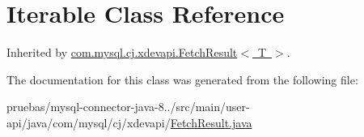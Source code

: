 \hypertarget{class_iterable}{}\section{Iterable Class Reference}
\label{class_iterable}


Inherited by \mbox{\hyperlink{interfacecom_1_1mysql_1_1cj_1_1xdevapi_1_1_fetch_result}{com.\+mysql.\+cj.\+xdevapi.\+Fetch\+Result$<$ T $>$}}.



The documentation for this class was generated from the following file\+:\begin{DoxyCompactItemize}
\item 
pruebas/mysql-\/connector-\/java-\/8../src/main/user-\/api/java/com/mysql/cj/xdevapi/\mbox{\hyperlink{_fetch_result_8java}{Fetch\+Result.\+java}}\end{DoxyCompactItemize}
